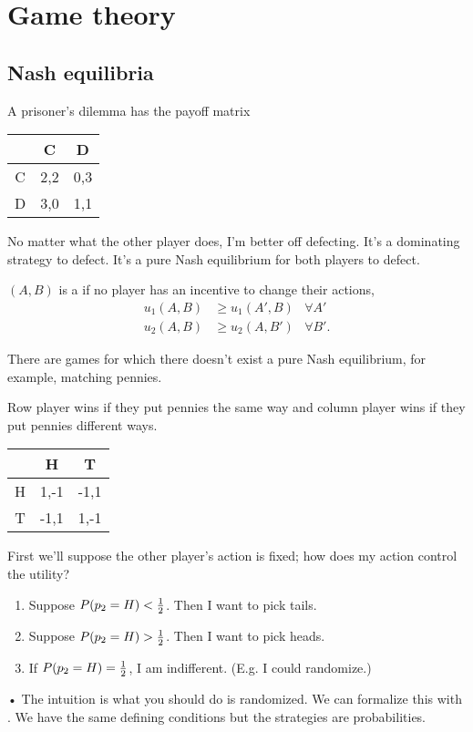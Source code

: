 \documentclass[11pt]{article}
\begin{document}

\section{Game theory}

\subsection{Nash equilibria}

A prisoner's dilemma has the payoff matrix

\begin{center}
\begin{tabular}{c|c|c|}
& C & D\tabularnewline
\hline
C& 2,2 & 0,3\tabularnewline
\hline
D&3,0 &1,1\tabularnewline
\hline
\end{tabular}
\end{center}

No matter what the other player does, I'm better off defecting. It's a dominating strategy to defect. It's a pure Nash equilibrium for both players to defect.

\begin{df}
$(A,B)$ is a   if no player has an incentive to change their actions, 
\begin{align}
u_1(A,B)&\ge u_1(A',B) &\forall A'\\
u_2(A,B)&\ge u_2(A,B') &\forall B'.
\end{align}
\end{df}
There are games for which there doesn't exist a pure Nash equilibrium, for example, matching pennies.

Row player wins if they put pennies the same way and column player wins if they put pennies different ways.

\begin{center}
\begin{tabular}{c|c|c|}
& H & T\tabularnewline
\hline
H& 1,-1 & -1,1\tabularnewline
\hline
T&-1,1 &1,-1\tabularnewline
\hline
\end{tabular}
\end{center}


First we'll suppose the other player's action is fixed; how does my action control the utility?

\begin{enumerate}
\item
Suppose $P(p_2=H)<\frac{1}{2}$. Then I want to pick tails.
\item
Suppose $P(p_2=H)>\frac{1}{2}$. Then I want to pick heads.
\item
If $P(p_2=H)=\frac{1}{2}$, I am indifferent. (E.g. I could randomize.)
\end{enumerate}•
The intuition is what you should do is randomized. We can formalize this with . We have the same defining conditions but the strategies are probabilities.
\end{document}
